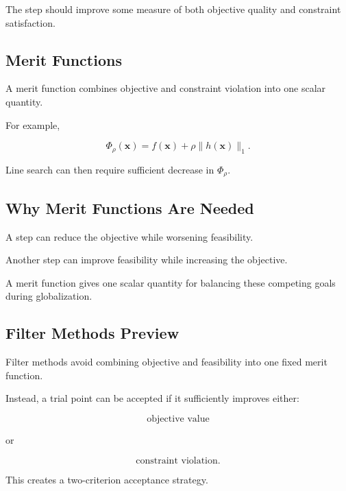 The step should improve some measure of both objective quality and
constraint satisfaction.

\subsection{Merit Functions}
\label{subsec:nlp-merit-functions}

A merit function combines objective and constraint violation into one
scalar quantity.

For example,

\[
\boxed{
\Phi_\rho(\mathbf{x})
=
f(\mathbf{x})
+
\rho
\|
h(\mathbf{x})
\|_1.
}
\]

Line search can then require sufficient decrease in \(\Phi_\rho\).

\subsection{Why Merit Functions Are Needed}
\label{subsec:why-merit-functions}

A step can reduce the objective while worsening feasibility.

Another step can improve feasibility while increasing the objective.

A merit function gives one scalar quantity for balancing these competing
goals during globalization.

\subsection{Filter Methods Preview}
\label{subsec:filter-methods-preview}

Filter methods avoid combining objective and feasibility into one fixed
merit function.

Instead, a trial point can be accepted if it sufficiently improves either:

\[
\boxed{
\text{objective value}
}
\]

or

\[
\boxed{
\text{constraint violation}.
}
\]

This creates a two-criterion acceptance strategy.

